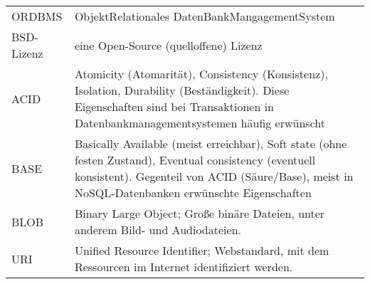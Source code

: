 \begin{center}
    \begin{tabularx}{\textwidth}{ |X|X| }
     \hline
     ORDBMS & ObjektRelationales DatenBankMangagementSystem \\
     BSD-Lizenz & eine Open-Source (quelloffene) Lizenz \\
     ACID & Atomicity (Atomarität), Consistency (Konsistenz), Isolation, Durability (Beständigkeit). Diese Eigenschaften sind bei Transaktionen in Datenbankmanagementsystemen häufig erwünscht \\
     BASE & Basically Available (meist erreichbar), Soft state (ohne festen Zustand), Eventual consistency (eventuell konsistent). Gegenteil von ACID (Säure/Base), meist in NoSQL-Datenbanken erwünschte Eigenschaften \\
     BLOB & Binary Large Object; Große binäre Dateien, unter anderem Bild- und Audiodateien. \\
     URI  & Unified Resource Identifier; Webstandard, mit dem Ressourcen im Internet identifiziert werden. \\
     \hline
    \end{tabularx}
\end{center}